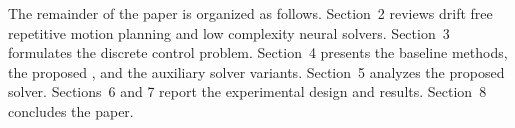 The remainder of the paper is organized as follows. Section~2 reviews drift free repetitive motion planning and low complexity neural solvers. Section~3 formulates the discrete control problem. Section~4 presents the baseline methods, the proposed \methodtwoDL{}, and the auxiliary solver variants. Section~5 analyzes the proposed solver. Sections~6 and 7 report the experimental design and results. Section~8 concludes the paper.
